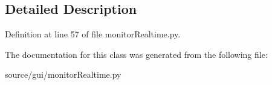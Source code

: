 \subsection{Detailed Description}


Definition at line 57 of file monitor\+Realtime.\+py.



The documentation for this class was generated from the following file\+:\begin{DoxyCompactItemize}
\item 
source/gui/monitor\+Realtime.\+py\end{DoxyCompactItemize}
